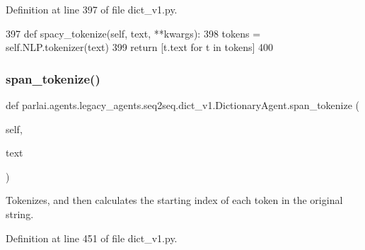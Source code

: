 Definition at line 397 of file dict\+\_\+v1.\+py.


\begin{DoxyCode}
397     \textcolor{keyword}{def }spacy\_tokenize(self, text, **kwargs):
398         tokens = self.NLP.tokenizer(text)
399         \textcolor{keywordflow}{return} [t.text \textcolor{keywordflow}{for} t \textcolor{keywordflow}{in} tokens]
400 
\end{DoxyCode}
\mbox{\label{classparlai_1_1agents_1_1legacy__agents_1_1seq2seq_1_1dict__v1_1_1DictionaryAgent_a0927c0c01fe0abd28964a992e42c0548}} 
\subsubsection{\texorpdfstring{span\+\_\+tokenize()}{span\_tokenize()}}
{\footnotesize\ttfamily def parlai.\+agents.\+legacy\+\_\+agents.\+seq2seq.\+dict\+\_\+v1.\+Dictionary\+Agent.\+span\+\_\+tokenize (\begin{DoxyParamCaption}\item[{}]{self,  }\item[{}]{text }\end{DoxyParamCaption})}

\begin{DoxyVerb}Tokenizes, and then calculates the starting index of each token in the original
string.
\end{DoxyVerb}
 

Definition at line 451 of file dict\+\_\+v1.\+py.


